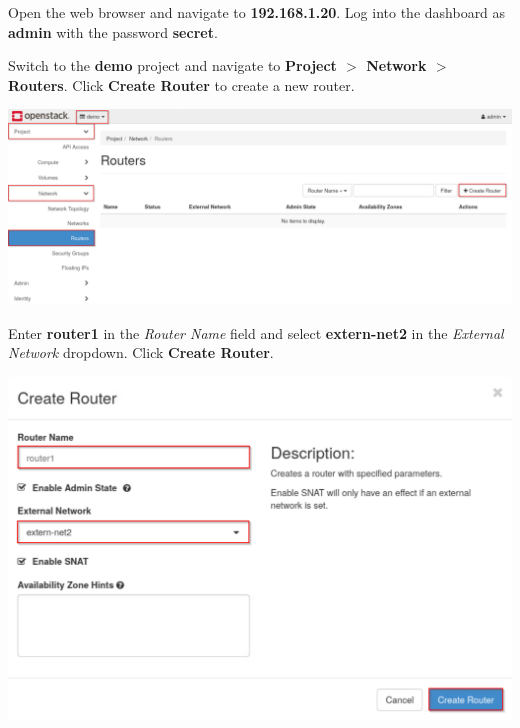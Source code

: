 \documentclass[letterpaper, 12pt]{article}
\begin{document}
\begin{enumerate}
    \begin{labstep}
        Open the web browser and navigate to \textbf{192.168.1.20}.
        Log into the dashboard as \textbf{admin} with the password \textbf{secret}.
    \end{labstep}

    \begin{labstep}
        Switch to the \textbf{demo} project and navigate to \textbf{Project $>$ Network $>$ Routers}.
        Click \textbf{Create Router} to create a new router.

        \begin{center}
            \includegraphics[width=\linewidth]{images/part2/step2.png}
        \end{center}
    \end{labstep}

    \begin{labstep}
        Enter \textbf{router1} in the \textit{Router Name} field and select \textbf{extern-net2} in the \textit{External Network} dropdown.
        Click \textbf{Create Router}.

        \begin{center}
            \includegraphics[width=\linewidth]{images/part2/step3.png}
        \end{center}
    \end{labstep}


\end{enumerate}
\end{document}

